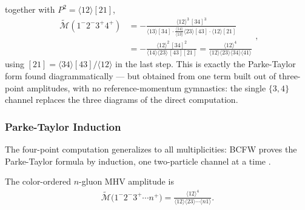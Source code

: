 together with $P^2 = \langle 12 \rangle [21]$,
\[
	\begin{aligned}
	\widetilde{\mathcal{M}}(1^-2^-3^+4^+)
	&= -\frac{\langle 12 \rangle^3\, [34]^3}{\langle 13 \rangle [34] \cdot \frac{\langle 14 \rangle}{\langle 13 \rangle} \langle 23 \rangle [43] \cdot \langle 12 \rangle [21]} \\
	&= -\frac{\langle 12 \rangle^2\, [34]^2}{\langle 14 \rangle \langle 23 \rangle\, [43] [21]}
	= \frac{\langle 12 \rangle^4}{\langle 12 \rangle \langle 23 \rangle \langle 34 \rangle \langle 41 \rangle}
	\end{aligned}
,\]
using $[21] = \langle 34 \rangle [43] / \langle 12 \rangle$ in the last step. This is exactly the Parke-Taylor form found diagrammatically --- but obtained from one term built out of three-point amplitudes, with no reference-momentum gymnastics: the single $\{3,4\}$ channel replaces the three diagrams of the direct computation.

\subsubsection{Parke-Taylor Induction}
\label{subsubsec:parke-taylor-induction}

The four-point computation generalizes to all multiplicities: BCFW proves the Parke-Taylor formula by induction, one two-particle channel at a time \autocite[\S27.5]{schwartzQFT2014}.

\begin{theorem}
	\label{thm:parke-taylor}
	The color-ordered $n$-gluon MHV amplitude is
	\begin{align}
		\label{eq:parke-taylor}
		\widetilde{\mathcal{M}}\big(1^- 2^- 3^+ \cdots n^+\big)
		= \frac{\langle 12 \rangle^4}{\langle 12 \rangle \langle 23 \rangle \cdots \langle n1 \rangle}
	.\end{align}
\end{theorem}

